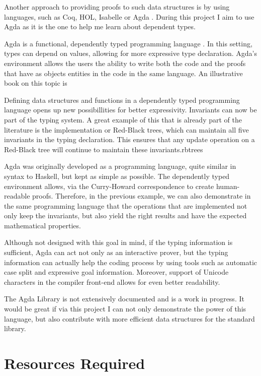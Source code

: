 \documentclass[12pt]{article}
\begin{document}
Another approach to providing proofs to such data structures is by using languages,
such as Coq, HOL, Isabelle or Agda \cite{agda}. During this project I aim to use Agda as it is the one
to help me learn about dependent types.

Agda is a functional, dependently typed programming language \cite{agda}. In this setting,
types can depend on values, allowing for more expressive type declaration.
Agda's environment allows the users the ability to write both the code and the
proofs that have as objects entities in the code in the same language. An illustrative
book on this topic is \cite{verif}

Defining data structures and functions in a dependently typed programming language
opens up new possibillities for better expressivity. Invariants can now be part of
the typing system. A great example of this that is already part of the literature
is the implementation or Red-Black trees, which can maintain all five invariants
in the typing declaration. This ensures that any update operation on a Red-Black
tree will continue to maintain these invariants.{rbtrees}

Agda was originally developed as a programming language, quite similar in syntax
to Haskell, but kept as simple as possible. The dependently typed environment
allows, via the Curry-Howard correspondence to create human-readable proofs.
Therefore, in the previous example, we can also demonstrate in the same programming
language that the operations that are implemented not only keep the invariants, but
also yield the right results and have the expected mathematical properties.

Although not designed with this goal in mind, if the typing information is
sufficient, Agda can act not only as an interactive prover, but the typing information
can actually help the coding process by using tools such as automatic case split and
expressive goal information.
Moreover, support of Unicode characters in the compiler front-end allows for
even better readability.

The Agda Library is not extensively documented and is a work in progress. It would
be great if via this project I can not only demonstrate the power of this language,
but also contribute with more efficient data structures for the standard library.

\section*{Resources Required}
\end{document}
